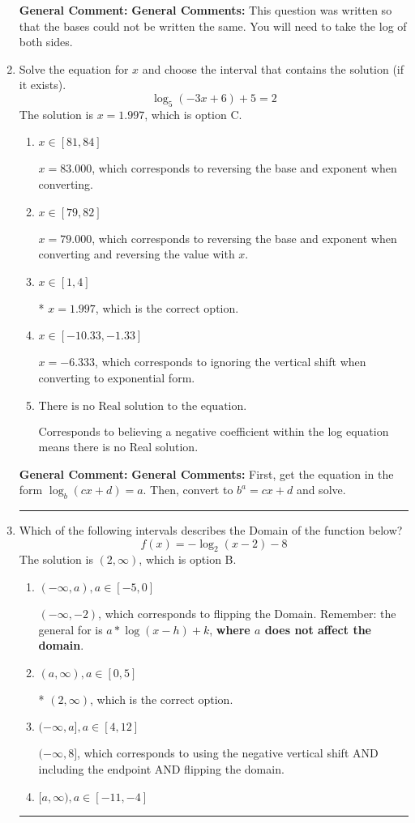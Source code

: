 \documentclass{extbook}[14pt]
\newcommand{\litem}[1]{\item #1

\rule{\textwidth}{0.4pt}}
\begin{document}
\begin{enumerate}
{\textbf{General Comment:} \textbf{General Comments:} This question was written so that the bases could not be written the same. You will need to take the log of both sides.
}
\litem{
Solve the equation for $x$ and choose the interval that contains the solution (if it exists).
\[ \log_{5}{(-3x+6)}+5 = 2 \]The solution is \( x = 1.997 \), which is option C.\begin{enumerate}[label=\Alph*.]
\item \( x \in [81, 84] \)

$x = 83.000$, which corresponds to reversing the base and exponent when converting.
\item \( x \in [79, 82] \)

$x = 79.000$, which corresponds to reversing the base and exponent when converting and reversing the value with $x$.
\item \( x \in [1, 4] \)

* $x = 1.997$, which is the correct option.
\item \( x \in [-10.33, -1.33] \)

$x = -6.333$, which corresponds to ignoring the vertical shift when converting to exponential form.
\item \( \text{There is no Real solution to the equation.} \)

Corresponds to believing a negative coefficient within the log equation means there is no Real solution.
\end{enumerate}

\textbf{General Comment:} \textbf{General Comments:} First, get the equation in the form $\log_b{(cx+d)} = a$. Then, convert to $b^a = cx+d$ and solve.
}
\litem{
Which of the following intervals describes the Domain of the function below?
\[ f(x) = -\log_2{(x-2)}-8 \]The solution is \( (2, \infty) \), which is option B.\begin{enumerate}[label=\Alph*.]
\item \( (-\infty, a), a \in [-5, 0] \)

$(-\infty, -2)$, which corresponds to flipping the Domain. Remember: the general for is $a*\log(x-h)+k$, \textbf{where $a$ does not affect the domain}.
\item \( (a, \infty), a \in [0, 5] \)

* $(2, \infty)$, which is the correct option.
\item \( (-\infty, a], a \in [4, 12] \)

$(-\infty, 8]$, which corresponds to using the negative vertical shift AND including the endpoint AND flipping the domain.
\item \( [a, \infty), a \in [-11, -4] \)


\end{enumerate}}
\end{enumerate}
\end{document}
